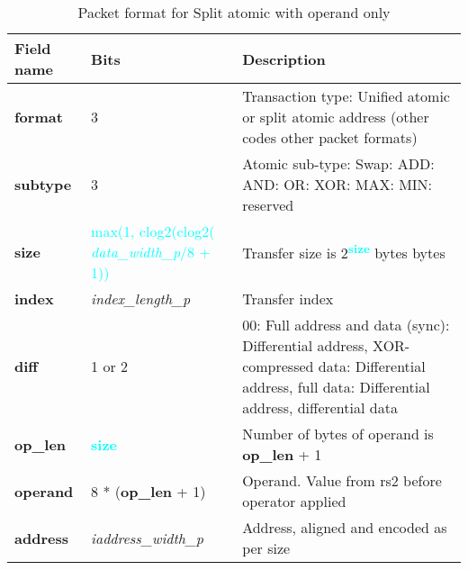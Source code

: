 \begin{table}[htp]
  \centering
  \caption{Packet format for Split atomic with operand only}
  \label{tab:te_datadx0y8}
  \begin{tabulary}{\textwidth}{|l|p{38mm}|p{92mm}|}
    \hline
    {\bf Field name} & {\bf Bits} & {\bf Description} \\
    \hline
    \textbf{format} & 	3	& Transaction type: Unified atomic or split atomic address\newline	
		(other codes other packet formats)\\
    \hline
    \textbf{subtype} & 	3	& Atomic sub-type: Swap: ADD: AND: OR: XOR: MAX: MIN: reserved\\	
    \hline
    \textbf{size} & \textcolor{cyan}{max(1, clog2(clog2( \textit{data\_width\_p}/8 + 1))} & Transfer size is 2\textsuperscript{\textcolor{cyan}{\textbf{size}}} bytes bytes\\
    \hline
    \textbf{index} & \textit{index\_length\_p} & Transfer index\\
    \textbf{diff} & 1 or 2 & 00: Full address and data (sync):  Differential address, XOR-compressed data: Differential address, full data: Differential address, differential data\\
    \hline
    \textbf{op\_len} & \textcolor{cyan}{\textbf{size}} &	Number of bytes of operand is \textbf{op\_len} + 1\\
    \hline
    \textbf{operand}	& 8 * (\textbf{op\_len} + 1) & Operand.  Value from rs2 before operator applied\\
    \hline
    \textbf{address} &  \textit{iaddress\_width\_p} &Address, aligned and encoded as per size \\
    \hline
  \end{tabulary}
\end{table}

